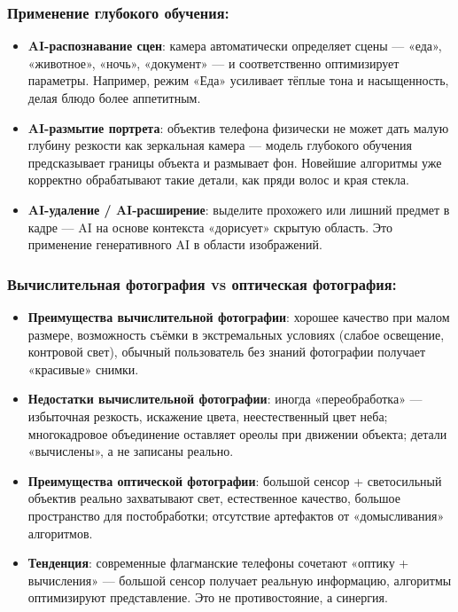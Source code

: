 \subsubsection*{Применение глубокого обучения:}

\begin{itemize}
  \item \textbf{AI-распознавание сцен}: камера автоматически определяет сцены — «еда», «животное», «ночь», «документ» — и соответственно оптимизирует параметры. Например, режим «Еда» усиливает тёплые тона и насыщенность, делая блюдо более аппетитным.
  \item \textbf{AI-размытие портрета}: объектив телефона физически не может дать малую глубину резкости как зеркальная камера — модель глубокого обучения предсказывает границы объекта и размывает фон. Новейшие алгоритмы уже корректно обрабатывают такие детали, как пряди волос и края стекла.
  \item \textbf{AI-удаление / AI-расширение}: выделите прохожего или лишний предмет в кадре — AI на основе контекста «дорисует» скрытую область. Это применение генеративного AI в области изображений.
\end{itemize}

\subsubsection*{Вычислительная фотография vs оптическая фотография:}

\begin{itemize}
  \item \textbf{Преимущества вычислительной фотографии}: хорошее качество при малом размере, возможность съёмки в экстремальных условиях (слабое освещение, контровой свет), обычный пользователь без знаний фотографии получает «красивые» снимки.
  \item \textbf{Недостатки вычислительной фотографии}: иногда «переобработка» — избыточная резкость, искажение цвета, неестественный цвет неба; многокадровое объединение оставляет ореолы при движении объекта; детали «вычислены», а не записаны реально.
  \item \textbf{Преимущества оптической фотографии}: большой сенсор + светосильный объектив реально захватывают свет, естественное качество, большое пространство для постобработки; отсутствие артефактов от «домысливания» алгоритмов.
  \item \textbf{Тенденция}: современные флагманские телефоны сочетают «оптику + вычисления» — большой сенсор получает реальную информацию, алгоритмы оптимизируют представление. Это не противостояние, а синергия.
\end{itemize}

